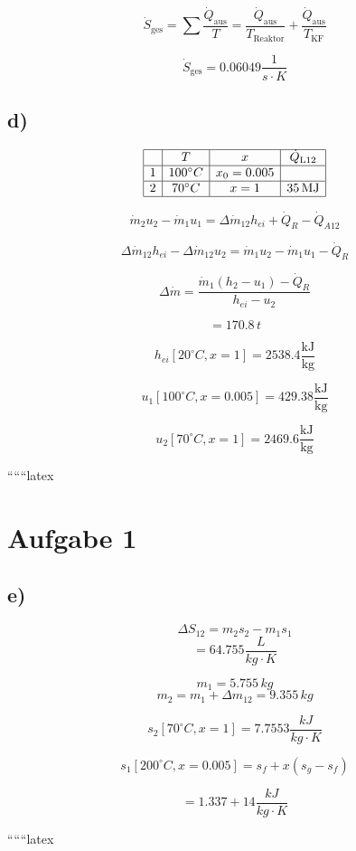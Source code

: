 \[
\dot{S}_{\text{ges}} = \sum \frac{\dot{Q}_{\text{aus}}}{T} = \frac{\dot{Q}_{\text{aus}}}{T_{\text{Reaktor}}} + \frac{\dot{Q}_{\text{aus}}}{T_{\text{KF}}}
\]

\[
\dot{S}_{\text{ges}} = 0.06049 \frac{1}{s \cdot K}
\]

\subsection*{d)}

\[
\begin{array}{|c|c|c|c|}
\hline
 & T & x & \dot{Q}_{\text{L12}} \\
\hline
1 & 100^\circ C & x_0 = 0.005 & \\
\hline
2 & 70^\circ C & x = 1 & 35 \, \text{MJ} \\
\hline
\end{array}
\]

\[
\dot{m}_2 u_2 - \dot{m}_1 u_1 = \Delta \dot{m}_{12} h_{ei} + \dot{Q}_R - \dot{Q}_{A12}
\]

\[
\Delta \dot{m}_{12} h_{ei} - \Delta \dot{m}_{12} u_2 = \dot{m}_1 u_2 - \dot{m}_1 u_1 - \dot{Q}_R
\]

\[
\Delta \dot{m} = \frac{\dot{m}_1 (h_2 - u_1) - \dot{Q}_R}{h_{ei} - u_2}
\]

\[
= 170.8 \, t
\]

\[
h_{ei} [20^\circ C, x = 1] = 2538.4 \frac{\text{kJ}}{\text{kg}}
\]

\[
u_1 [100^\circ C, x = 0.005] = 429.38 \frac{\text{kJ}}{\text{kg}}
\]

\[
u_2 [70^\circ C, x = 1] = 2469.6 \frac{\text{kJ}}{\text{kg}}
\]

``````latex


\section*{Aufgabe 1}
\subsection*{e)}

\[
\Delta S_{12} = m_2 s_2 - m_1 s_1
\]
\[
= 64.755 \frac{L}{kg \cdot K}
\]

\[
m_1 = 5.755 \, kg
\]
\[
m_2 = m_1 + \Delta m_{12} = 9.355 \, kg
\]

\[
s_2 [70^\circ C, x=1] = 7.7553 \frac{kJ}{kg \cdot K}
\]

\[
s_1 [200^\circ C, x=0.005] = s_f + x(s_g - s_f)
\]

\[
= 1.337 + 14 \frac{kJ}{kg \cdot K}
\]

``````latex


